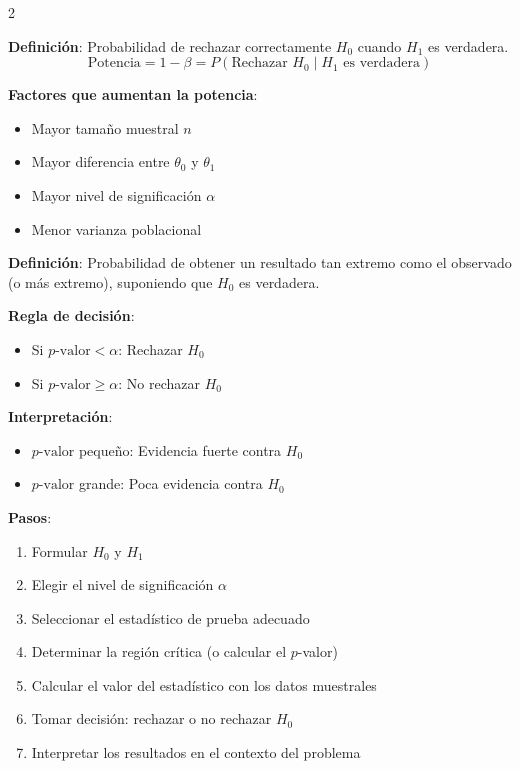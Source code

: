 \documentclass[10pt,a4paper]{article}
\begin{document}
\begin{multicols}{2}
    \begin{tcolorbox}[title=Potencia del Test, equal height group=CH2]
        \textbf{Definición}: Probabilidad de rechazar correctamente $H_0$ cuando $H_1$ es verdadera.
        \[
            \text{Potencia} = 1 - \beta = P(\text{Rechazar } H_0 \mid H_1 \text{ es verdadera})
        \]
        
        \textbf{Factores que aumentan la potencia}:
        \begin{itemize}
            \item Mayor tamaño muestral $n$
            \item Mayor diferencia entre $\theta_0$ y $\theta_1$
            \item Mayor nivel de significación $\alpha$
            \item Menor varianza poblacional
        \end{itemize}
    \end{tcolorbox}
    \begin{tcolorbox}[title=p-valor, equal height group=CH2]
        \textbf{Definición}: Probabilidad de obtener un resultado tan extremo como el observado (o más extremo), suponiendo que $H_0$ es verdadera.
        
        \textbf{Regla de decisión}:
        \begin{itemize}
            \item Si $p\text{-valor} < \alpha$: Rechazar $H_0$
            \item Si $p\text{-valor} \geq \alpha$: No rechazar $H_0$
        \end{itemize}
        
        \textbf{Interpretación}:
        \begin{itemize}
            \item $p\text{-valor}$ pequeño: Evidencia fuerte contra $H_0$
            \item $p\text{-valor}$ grande: Poca evidencia contra $H_0$
        \end{itemize}
    \end{tcolorbox}
\end{multicols}

\begin{tcolorbox}[title=Procedimiento General para Contrastes]
    \textbf{Pasos}:
    \begin{enumerate}
        \item Formular $H_0$ y $H_1$
        \item Elegir el nivel de significación $\alpha$
        \item Seleccionar el estadístico de prueba adecuado
        \item Determinar la región crítica (o calcular el $p$-valor)
        \item Calcular el valor del estadístico con los datos muestrales
        \item Tomar decisión: rechazar o no rechazar $H_0$
        \item Interpretar los resultados en el contexto del problema
    \end{enumerate}
\end{tcolorbox}
\end{document}
